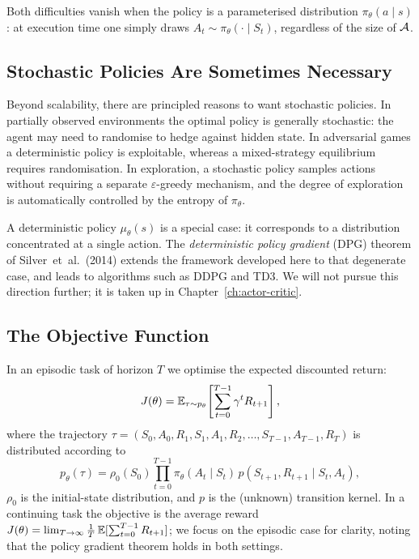 Both difficulties vanish when the policy is a parameterised distribution $\pi_\theta(a \mid s)$: at execution time one simply draws $A_t \sim \pi_\theta(\cdot \mid S_t)$, regardless of the size of $\mathcal{A}$.

\subsection{Stochastic Policies Are Sometimes Necessary}

Beyond scalability, there are principled reasons to want stochastic policies.  In partially observed environments the optimal policy is generally stochastic: the agent may need to randomise to hedge against hidden state.  In adversarial games a deterministic policy is exploitable, whereas a mixed-strategy equilibrium requires randomisation.  In exploration, a stochastic policy samples actions without requiring a separate $\varepsilon$-greedy mechanism, and the degree of exploration is automatically controlled by the entropy of $\pi_\theta$.

\begin{remark}
A deterministic policy $\mu_\theta(s)$ is a special case: it corresponds to a distribution concentrated at a single action.  The \emph{deterministic policy gradient} (DPG) theorem of Silver~et~al.\ (2014) extends the framework developed here to that degenerate case, and leads to algorithms such as DDPG and TD3.  We will not pursue this direction further; it is taken up in Chapter~\ref{ch:actor-critic}.
\end{remark}

\subsection{The Objective Function}

In an episodic task of horizon $T$ we optimise the expected discounted return:
\begin{equation}
\label{eq:pg-objective}
J(\theta) = \operatorname{\mathbb{E}}_{\tau \sim p_\theta}\!\left[\sum_{t=0}^{T-1} \gamma^t R_{t+1}\right],
\end{equation}
where the trajectory $\tau = (S_0, A_0, R_1, S_1, A_1, R_2, \ldots, S_{T-1}, A_{T-1}, R_T)$ is distributed according to
\begin{equation}
\label{eq:trajectory-density}
p_\theta(\tau) = \rho_0(S_0)\prod_{t=0}^{T-1} \pi_\theta(A_t \mid S_t)\, p(S_{t+1}, R_{t+1} \mid S_t, A_t),
\end{equation}
$\rho_0$ is the initial-state distribution, and $p$ is the (unknown) transition kernel.  In a continuing task the objective is the average reward $J(\theta) = \lim_{T\to\infty} \frac{1}{T}\operatorname{\mathbb{E}}[\sum_{t=0}^{T-1} R_{t+1}]$; we focus on the episodic case for clarity, noting that the policy gradient theorem holds in both settings.

